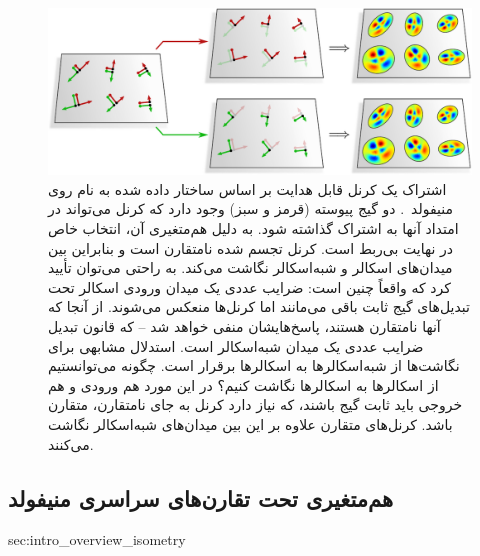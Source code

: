 \begin{figure}
	\centering
	\includegraphics[width=1.\textwidth]{figures/intro_kernel_alignment_reflect.pdf}
	\caption{\small
		اشتراک یک کرنل قابل هدایت \lr{$\Flip$} بر اساس ساختار \lr{$\Flip$} داده شده به نام \lr{$\RM$} روی منیفولد~.
		دو گیج پیوسته (قرمز و سبز) وجود دارد که کرنل می‌تواند در امتداد آنها به اشتراک گذاشته شود.
		به دلیل هم‌متغیری \lr{$\Flip$} آن، انتخاب خاص در نهایت بی‌ربط است.
		کرنل تجسم شده نامتقارن است و بنابراین بین میدان‌های اسکالر و شبه‌اسکالر نگاشت می‌کند.
		به راحتی می‌توان تأیید کرد که واقعاً چنین است:
		ضرایب عددی یک میدان ورودی اسکالر تحت تبدیل‌های گیج ثابت باقی می‌مانند اما کرنل‌ها منعکس می‌شوند.
		از آنجا که آنها نامتقارن هستند، پاسخ‌هایشان منفی خواهد شد -- که قانون تبدیل ضرایب عددی یک میدان شبه‌اسکالر است.
		استدلال مشابهی برای نگاشت‌ها از شبه‌اسکالرها به اسکالرها برقرار است.
		چگونه می‌توانستیم از اسکالرها به اسکالرها نگاشت کنیم؟
		در این مورد هم ورودی و هم خروجی باید ثابت گیج باشند، که نیاز دارد کرنل به جای نامتقارن، متقارن باشد.
		کرنل‌های متقارن علاوه بر این بین میدان‌های شبه‌اسکالر نگاشت می‌کنند.
	}
	\label{fig:intro_kernel_alignment_reflect}
\end{figure}




\toclesslab\subsection{هم‌متغیری تحت تقارن‌های سراسری منیفولد}{sec:intro_overview_isometry}

